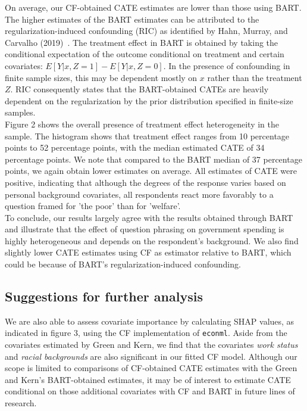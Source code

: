 \documentclass[12pt]{article}
\begin{document}
On average, our CF-obtained CATE estimates are lower than those using BART. The
higher estimates of the BART estimates can be attributed to the
regularization-induced confounding (RIC) as identified by Hahn, Murray, and
Carvalho (2019)~\cite{CarvalhoHahnMurray}. The treatment effect in BART is
obtained by taking the conditional expectation of the outcome conditional on
treatment and certain covariates: $E[Y|x,Z = 1] - E[Y|x,Z = 0]$. In the presence
of confounding in finite sample sizes, this may be dependent mostly on $x$
rather than the treatment $Z$. RIC consequently states that the BART-obtained
CATEs are heavily dependent on the regularization by the prior distribution
specified in finite-size samples. \\

Figure 2 shows the overall presence of treatment effect heterogeneity in the
sample. The histogram shows that treatment effect ranges from 10 percentage
points to 52 percentage points, with the median estimated CATE of 34 percentage
points. We note that compared to the BART median of 37 percentage points, we
again obtain lower estimates on average. All estimates of CATE were positive,
indicating that although the degrees of the response varies based on personal
background covariates, all respondents react more favorably to a question framed
for 'the poor' than for 'welfare'. \\

To conclude, our results largely agree with the results obtained through BART
and illustrate that the effect of question phrasing on government spending is
highly heterogeneous and depends on the respondent's background. We also find
slightly lower CATE estimates using CF as estimator relative to BART, which
could be because of BART's regularization-induced confounding. \\ 

\subsection{Suggestions for further analysis}
We are also able to assess covariate importance by calculating SHAP values, as
indicated in figure 3, using the CF implementation of \texttt{econml}. Aside
from the covariates estimated by Green and Kern, we find that the covariates
\textit{work status} and \textit{racial backgrounds} are also significant in our
fitted CF model. Although our scope is limited to comparisons of CF-obtained
CATE estimates with the Green and Kern's BART-obtained estimates, it may be of
interest to estimate CATE conditional on those additional covariates with CF and
BART in future lines of research. 
\end{document}
